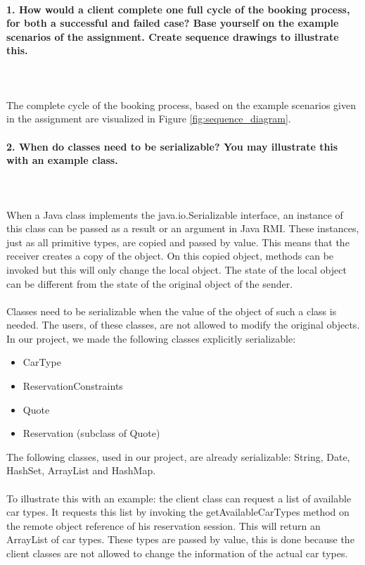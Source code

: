 \documentclass{ds-report}
\begin{document}
	\maketitle

	\paragraph{1. How would a client complete one full cycle of the booking process, for both a successful and
failed case? Base yourself on the example scenarios of the assignment. Create sequence drawings to illustrate this.} \mbox{}\\\\
The complete cycle of the booking process, based on the example scenarios given in the assignment are visualized in Figure \ref{fig:sequence_diagram}.

	
	\paragraph{2. When do classes need to be serializable? You may illustrate this with an example class.} \mbox{}\\\\
When a Java class implements the java.io.Serializable interface, an instance of this class can be passed as a result or an argument in Java RMI. These instances, just as all primitive types, are copied and passed by value. This means that the receiver creates a copy of the object. On this copied object, methods can be invoked but this will only change the local object. The state of the local object can be different from the state of the original object of the sender. \\\\
Classes need to be serializable when the value of the object of such a class is needed. The users, of these classes, are not allowed to modify the original objects. In our project, we made the following classes explicitly serializable:
\begin{itemize}
	\item CarType 
	\item ReservationConstraints 
	\item Quote
	\item Reservation (subclass of Quote)
\end{itemize}
The following classes, used in our project, are already serializable: String, Date, HashSet, ArrayList and HashMap.\\\\
To illustrate this with an example: the client class can request a list of available car types. It requests this list by invoking the getAvailableCarTypes method on the remote object reference of his reservation session. This will return an ArrayList of car types. These types are passed by value, this is done because the client classes are not allowed to change the information of the actual car types.
\clearpage
\end{document}
